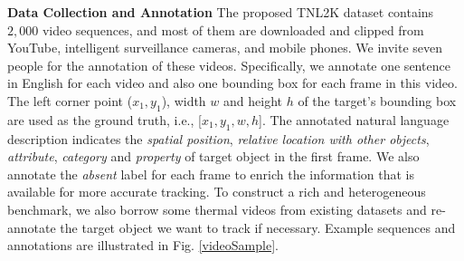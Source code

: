 \documentclass[final]{cvpr}
\begin{document}
\textbf{Data Collection and Annotation}
The proposed TNL2K dataset contains $2,000$ video sequences, and most of them are downloaded and clipped from YouTube, intelligent surveillance cameras, and mobile phones. We invite seven people for the annotation of these videos. Specifically, we annotate one sentence in English for each video and also one bounding box for each frame in this video. The left corner point ($x_1, y_1$), width $w$ and height $h$ of the target's bounding box are used as the ground truth, i.e., [$x_1, y_1, w, h$]. The annotated natural language description indicates the \emph{spatial position}, \emph{relative location with other objects}, \emph{attribute}, \emph{category} and \emph{property} of target object in the first frame. We also annotate the \emph{absent} label for each frame to enrich the information that is available for more accurate tracking. To construct a rich and heterogeneous benchmark, we also borrow some thermal videos from existing datasets \cite{li2019rgbt234, liu2019ptbtracking} and re-annotate the target object we want to track if necessary. Example sequences and annotations are illustrated in Fig. \ref{videoSample}. 
\end{document}
